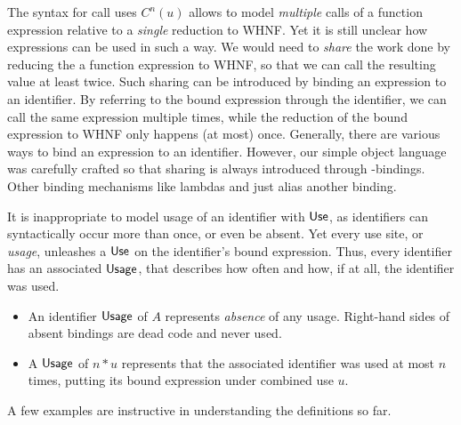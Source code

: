 The syntax for call uses $C^n(u)$ allows to model \emph{multiple} calls of a function expression relative to a \emph{single} reduction to WHNF. 
Yet it is still unclear how expressions can be used in such a way. 
We would need to \emph{share} the work done by reducing the a function expression to WHNF, so that we can call the resulting value at least twice.
Such sharing can be introduced by binding an expression to an identifier. 
By referring to the bound expression through the identifier, we can call the same expression multiple times, while the reduction of the bound expression to WHNF only happens (at most) once. 
Generally, there are various ways to bind an expression to an identifier. 
However, our simple object language was carefully crafted so that sharing is always introduced through -bindings. 
Other binding mechanisms like lambdas and  just alias another binding. 

It is inappropriate to model usage of an identifier with $\text{\textsf{Use}}$, as identifiers can syntactically occur more than once, or even be absent. 
Yet every use site, or \emph{usage}, unleashes a $\text{\textsf{Use}}$ on the identifier's bound expression. 
Thus, every identifier has an associated $\text{\textsf{Usage}}$, that describes how often and how, if at all, the identifier was used.

\begin{itemize}
\item An identifier $\text{\textsf{Usage}}$ of $A$ represents \emph{absence} of any usage. Right-hand sides of absent bindings are dead code and never used.
\item A $\text{\textsf{Usage}}$ of $n*u$ represents that the associated identifier was used at most $n$ times, putting its bound expression under combined use $u$.
\end{itemize}

A few examples are instructive in understanding the definitions so far.

